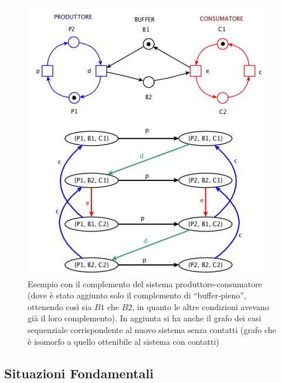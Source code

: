 \documentclass[a4paper,12pt, oneside]{book}
\begin{document}
\begin{figure}[H]
  \centering
  \includegraphics[scale = 0.6]{img/con3.jpg}
  \caption{Esempio con il complemento del sistema produttore-consumatore (dove è
    stato aggiunto solo il complemento di ``buffer-pieno'', ottenendo così sia
    $B1$ che $B2$, in quanto le altre condizioni avevano già il loro
    complemento). In aggiunta si ha anche il grafo dei casi sequenziale
    corrispondente al nuovo sistema senza contatti (grafo che è isomorfo a
    quello ottenibile al sistema con contatti)} 
\end{figure}
\subsection{Situazioni Fondamentali}
\end{document}
